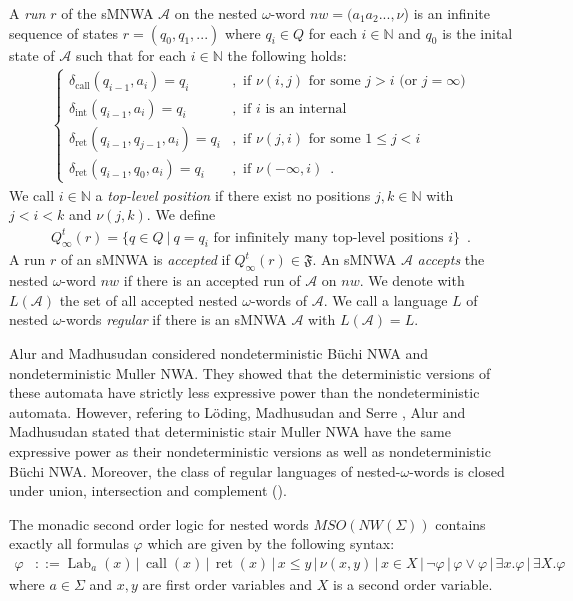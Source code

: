 \documentclass[runningheads, envcountsame, a4paper]{llncs}
\DeclareMathOperator{\call}{call}
\DeclareMathOperator{\ret}{ret}
\DeclareMathOperator{\Lab}{Lab}
\begin{document}
A \emph{run} $r$ of the sMNWA $\mathcal{A}$ on the nested $\omega$-word $\mathit{nw}=(a_1a_2...,\nu$) is an infinite sequence of states $r=(q_0,q_1,...)$ 
where $q_i \in Q$ for each $i \in \mathbb{N}$ 
and $q_0$ is the inital state of $\mathcal{A}$ such that for each $i \in \mathbb{N}$ the following holds:
\begin{align*}
 	\left \{ \begin{array}{ll}	
		\delta_{\call}(q_{i-1},a_i)=q_i 	&, \text{ if } \nu(i,j) \text{ for some } j>i \text{ (or $j=\infty$)} \\
		\delta_{\mathrm{int}}(q_{i-1},a_i)=q_i 	&, \text{ if $i$ is an internal } \\
		\delta_{\ret}(q_{i-1},q_{j-1},a_i)=q_i &, \text{ if } \nu(j,i) \text{ for some } 1 \le j<i \\
		\delta_{\ret}(q_{i-1},q_0,a_i)=q_i &, \text{ if } \nu(-\infty,i)\enspace.
	\end{array} \right .
\end{align*}
	 We call $i \in \mathbb{N}$ a \emph{top-level position} if there exist no positions $j,k \in \mathbb{N}$ with $j <i < k$ and $\nu(j,k)$. 
We define \begin{align*} Q^t_\infty(r)=\{q \in Q~|~q=q_i \mbox{ for infinitely many top-level positions }i\}\enspace. \end{align*} A run $r$ of an sMNWA is \emph{accepted} if $Q^t_\infty(r) \in \mathfrak{F}$.
An sMNWA $\mathcal{A}$ \emph{accepts} the nested $\omega$-word $\mathit{nw}$ if there is an accepted run of $\mathcal{A}$ on $\mathit{nw}$. We denote with $L(\mathcal{A})$ the set of all accepted nested $\omega$-words of $\mathcal{A}$. We call a language $L$ of nested $\omega$-words \emph{regular} if there is an sMNWA $\mathcal{A}$ with $L(\mathcal{A})=L$.
\par
Alur and Madhusudan \cite{AM} considered nondeterministic B\"uchi NWA and nondeterministic Muller NWA. They showed that the deterministic versions of these automata have strictly less expressive power than the nondeterministic automata. However, refering to L\"oding, Madhusudan and Serre \cite{LMS}, Alur and Madhusudan stated that deterministic stair Muller NWA have the same expressive power as their nondeterministic versions as well as nondeterministic B\"uchi NWA.
Moreover, the class of regular languages of nested-$\omega$-words is closed under union, intersection and complement (\cite{AM}).
\begin{Def}
	 The monadic second order logic for nested words $\mathit{MSO}(\mathit{NW}(\Sigma))$ contains exactly all formulas $\varphi$ which are given by the following syntax:
	\begin{align*}
	\varphi&::=\Lab_a(x)\, |\, \call(x)\, |\, \ret(x)\, |\, x \le y\, |\, \nu(x,y)\, |\, x \in X\, |\, \neg \varphi\, |\, \varphi \vee \varphi\, |\, \exists x. \varphi\, |\, \exists X. \varphi
	\end{align*}
where $a \in \Sigma$ and $x,y$ are first order variables and $X$ 
is a second order variable.
\end{Def}
\end{document}
